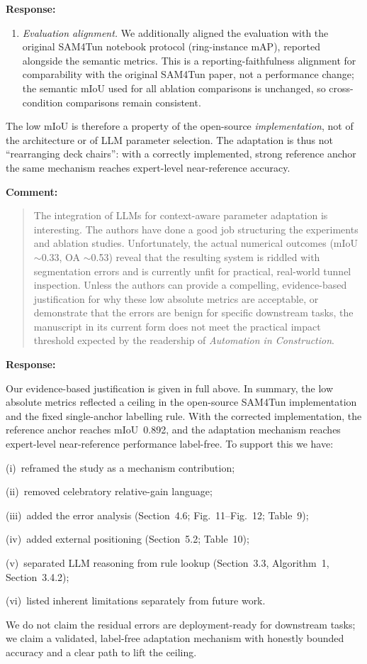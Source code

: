 \documentclass[11pt,a4paper]{article}
\newcommand{\MSErrorCompositionTable}{Table~9}
\newcommand{\MSSOTATable}{Table~10}
\newcommand{\MSErrorMechanismFigure}{Fig.~11}
\newcommand{\MSErrorMapFigure}{Fig.~12}
\newenvironment{commentblock}{%
  \par\smallskip\noindent\textbf{Comment:}\par
  \begin{quote}\itshape\color{black}
}{%
  \end{quote}\smallskip
}
\newenvironment{responseblock}{%
  \par\smallskip\noindent\textbf{Response:}\par
  \begingroup\color{responsegreen}
}{%
  \endgroup\smallskip
}
\begin{document}
\begin{responseblock}
\begin{enumerate}
\item \emph{Evaluation alignment.} We additionally aligned the evaluation with the original SAM4Tun notebook protocol (ring-instance mAP), reported alongside the semantic metrics. This is a reporting-faithfulness alignment for comparability with the original SAM4Tun paper, not a performance change; the semantic mIoU used for all ablation comparisons is unchanged, so cross-condition comparisons remain consistent.
\end{enumerate}
The low mIoU is therefore a property of the open-source \emph{implementation}, not of the architecture or of LLM parameter selection. The adaptation is thus not ``rearranging deck chairs'': with a correctly implemented, strong reference anchor the same mechanism reaches expert-level near-reference accuracy.
\end{responseblock}

\begin{commentblock}
The integration of LLMs for context-aware parameter adaptation is interesting. The authors have done a good job structuring the experiments and ablation studies. Unfortunately, the actual numerical outcomes (mIoU $\sim$0.33, OA $\sim$0.53) reveal that the resulting system is riddled with segmentation errors and is currently unfit for practical, real-world tunnel inspection. Unless the authors can provide a compelling, evidence-based justification for why these low absolute metrics are acceptable, or demonstrate that the errors are benign for specific downstream tasks, the manuscript in its current form does not meet the practical impact threshold expected by the readership of \emph{Automation in Construction}.
\end{commentblock}
\begin{responseblock}
Our evidence-based justification is given in full above. In summary, the low absolute metrics reflected a ceiling in the open-source SAM4Tun implementation and the fixed single-anchor labelling rule. With the corrected implementation, the reference anchor reaches mIoU~0.892, and the adaptation mechanism reaches expert-level near-reference performance label-free. To support this we have:

(i)~reframed the study as a mechanism contribution; 

(ii)~removed celebratory relative-gain language;

(iii)~added the error analysis (Section~4.6; \MSErrorMechanismFigure--\MSErrorMapFigure; \MSErrorCompositionTable); 

(iv)~added external positioning (Section~5.2; \MSSOTATable);

(v)~separated LLM reasoning from rule lookup (Section~3.3, Algorithm~1, Section~3.4.2); 

(vi)~listed inherent limitations separately from future work. 

We do not claim the residual errors are deployment-ready for downstream tasks; we claim a validated, label-free adaptation mechanism with honestly bounded accuracy and a clear path to lift the ceiling.
\end{responseblock}
\end{document}
